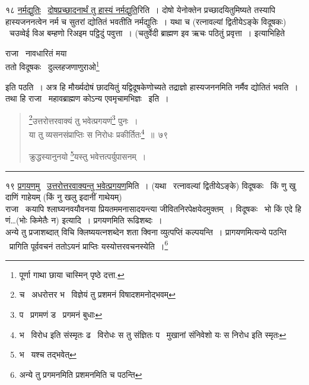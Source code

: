 \documentclass[11pt, openany]{book}
\begin{document}
१८ \underline{नर्मद्युतिः} \textendash\ \underline{दोषप्रच्छादनार्थं तु हास्यं नर्मद्युति}रिति~। दोषो येनोक्तेन प्रच्छादयितुमिष्यते तस्यापि हास्यजननत्वेन नर्म च सुतरां द्योतितं भवतीति नर्मद्युतिः~। यथा च (रत्नावल्यां द्वितीयेऽङ्के विदूषकः) \textendash\ चउव्वेई विअ बम्हणो रिअइम पट्ठिदुं पवुत्ता~। (चतुर्वेदी ब्राह्मण इव ऋचः पठितुं प्रवृत्ता~। इत्याभिहिते

\begin{center}
राजा \textendash\ नावधारितं मया\\
ततो विदूषकः \textendash\ दुल्लहजणाणुराओ\renewcommand{\thefootnote}{$\dagger$}\footnote{पूर्णा गाथा छाया चास्मिन् पृष्ठे दत्ता.}
\end{center}

\noindent
इति पठति~। अत्र हि मौर्ख्यदोषं छादयितुं यद्विदूषकेणोच्यते तद्राज्ञो हास्यजननमिति नर्मैव द्योतितं भवति~। तथा हि राजा \textendash\ महावब्राह्मण कोऽन्य एवमृचामभिज्ञः \textendash\ इति~।

\newpage

\begin{quote}
{\na \renewcommand{\thefootnote}{1}\footnote{च \textendash\ अधरोत्तर भ \textendash\ विज्ञेयं तु प्रशमनं विषादशमनोद्भवम्}उत्तरोत्तरवाक्यं तु भवेत्प्रगयणं\renewcommand{\thefootnote}{2}\footnote{प \textendash\ प्रगमणं ड \textendash\ प्रगमनं बुधाः} पुनः~।\\
या तु व्यसनसंप्राप्तिः स निरोधः प्रकीर्तितः\renewcommand{\thefootnote}{3}\footnote{भ \textendash\ विरोध इति संस्मृतः ढ \textendash\ विरोधः स तु संज्ञितः प \textendash\ मुखानां संनिवेशो यः स निरोध इति स्मृतः}~॥~७९

क्रुद्धस्यानुनयो \renewcommand{\thefootnote}{4}\footnote{भ \textendash\ यश्च तद्भवेत्}यस्तु भवेत्तत्पर्युपासनम्~।}
\end{quote}

\hrule

\vspace{2mm}
१९ \underline{प्रगयणमु} \textendash\ \underline{उत्तरोत्तरवाक्यन्तु भवेत्प्रगयण}मिति~। (यथा \textendash\ रत्नावल्यां द्वितीयेऽङ्के) विदूषकः \textendash\ किं णु खु दाणिं गाहेयम् (किं नु खलु इदानीं गाथेयम्)\\

राजा \textendash\ कयापि श्लाघ्यनवयौवनया प्रियतममनासादयन्त्या जीवितनिरपेक्षयेदमुक्तम्~। विदूषकः \textendash\ भो किं एदे हि णं\ldots (भोः किमेतैः न) इत्यादि~। प्रगयणमिति रूढिशब्दः~।\\

अन्ये तु प्रजाशब्दात् विचि क्लिष्ययत्नशब्देन शता क्विना व्युत्पप्तिं कल्पयन्ति~। प्रागयणमित्यन्ये पठन्ति \textendash\ प्रागिति पूर्ववचनं ततोऽयनं प्राप्तिः यस्योत्तरवचनस्येति~।\renewcommand{\thefootnote}{*}\footnote{अन्ये तु प्रगमनमिति प्रशमनमिति च पठन्ति}\\
\end{document}
